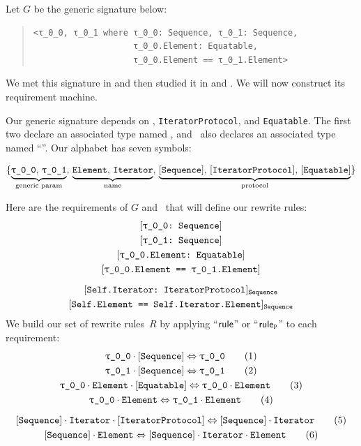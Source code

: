 \documentclass[../generics]{subfiles}
\begin{document}
\begin{example}\label{rqm first example}
Let $G$ be the generic signature below:
\begin{quote}
\begin{verbatim}
<τ_0_0, τ_0_1 where τ_0_0: Sequence, τ_0_1: Sequence,
                    τ_0_0.Element: Equatable,
                    τ_0_0.Element == τ_0_1.Element>
\end{verbatim}
\end{quote}
We met this signature in  and then studied it in  and . We will now construct its requirement machine.

Our generic signature depends on \tSequence, \texttt{IteratorProtocol}, and \texttt{Equatable}. The first two declare an associated type named \nElement, and \tSequence\ also declares an associated type named ``\nIterator''. Our alphabet has seven symbols:
\begin{ceqn}
\[
\{ \underbrace{\mathstrut\rT,\, \rU}_{\text{generic param\vphantom{l}}},\, \underbrace{\mathstrut\nElement,\, \nIterator}_{\text{name\vphantom{pl}}},\, \underbrace{\mathstrut\pSequence,\, \pIterator,\,\pEquatable}_{\text{protocol}}\}
\]
\end{ceqn}

Here are the requirements of $G$ and \tSequence\ that will define our rewrite rules:
\begin{gather*}
\rTSequence\\
\rUSequence\\
\ConfReq{\rT.Element}{Equatable}\\
\SameReq{\rT.Element}{\rU.Element}\\[\medskipamount]
\AssocConfReq{Self.Iterator}{IteratorProtocol}{Sequence}\\
\AssocSameReq{Self.Element}{Self.Iterator.Element}{Sequence}
\end{gather*}
We build our set of rewrite rules~$R$ by applying ``$\mathsf{rule}$'' or ``$\mathsf{rule}_{\texttt{P}}$'' to each requirement:
\begin{gather*}
\ConfRule{\rT}{\pSequence} \tag{1} \\
\ConfRule{\rU}{\pSequence} \tag{2} \\
\ConfRule{\rT\cdot\nElement}{\protosym{Equatable}} \tag{3} \\
\SameRule{\rT\cdot\nElement}{\rU\cdot\nElement}\tag{4} \\[\medskipamount]
\ConfRule{\pSequence\cdot\nIterator}{\pIterator} \tag{5} \\
\SameRule{\pSequence\cdot\nElement}{\pSequence\cdot\nIterator\cdot\nElement} \tag{6}
\end{gather*}


\end{example}
\end{document}
